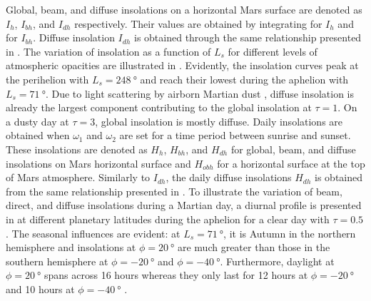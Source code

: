 Global, beam, and diffuse insolations on a horizontal Mars surface are denoted as $I_{h}$, $I_{bh}$, and $I_{dh}$ respectively. Their values are obtained by integrating  for $I_{h}$ and  for $I_{bh}$. Diffuse insolation $I_{dh}$ is obtained through the same relationship presented in . The variation of insolation as a function of $L_{s}$ for different levels of atmospheric opacities are illustrated in . Evidently, the insolation curves peak at the perihelion with $L_{s} = \SI{248}{\degree}$ and reach their lowest during the aphelion with $L_{s} = \SI{71}{\degree}$. Due to light scattering by airborn Martian dust , diffuse insolation is already the largest component contributing to the global insolation at $\tau = 1$. On a dusty day at $\tau = 3$, global insolation is mostly diffuse. Daily insolations are obtained when $\omega_1$ and $\omega_2$ are set for a time period between sunrise and sunset. These insolations are denoted as $H_{h}$, $H_{bh}$, and $H_{dh}$ for global, beam, and diffuse insolations on Mars horizontal surface and $H_{obh}$ for a horizontal surface at the top of Mars atmosphere. Similarly to $I_{dh}$, the daily diffuse insolations $H_{dh}$ is obtained from the same relationship presented in . To illustrate the variation of beam, direct, and diffuse insolations during a Martian day, a diurnal profile is presented in  at different planetary latitudes during the aphelion for a clear day with $\tau = 0.5$. The seasonal influences are evident: at $L_{s} = \SI{71}{\degree}$, it is Autumn in the northern hemisphere and insolations at $\phi = \SI{20}{\degree}$ are much greater than those in the southern hemisphere at $\phi = \SI{-20}{\degree}$ and $\phi = \SI{-40}{\degree}$. Furthermore, daylight at $\phi = \SI{20}{\degree}$ spans across 16 hours whereas they only last for 12 hours at $\phi = \SI{-20}{\degree}$ and 10 hours at $\phi = \SI{-40}{\degree}$ .


